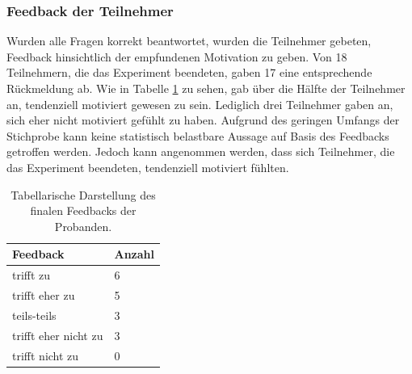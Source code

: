 \subsubsection{Feedback der Teilnehmer}
Wurden alle Fragen korrekt beantwortet, wurden die Teilnehmer gebeten, Feedback hinsichtlich der empfundenen Motivation zu geben. Von 18 Teilnehmern, die das Experiment beendeten, gaben 17 eine entsprechende Rückmeldung ab. Wie in Tabelle \ref{feedback} zu sehen, gab über die Hälfte der Teilnehmer an, tendenziell motiviert gewesen zu sein. Lediglich drei Teilnehmer gaben an, sich eher nicht motiviert gefühlt zu haben. Aufgrund des geringen Umfangs der Stichprobe kann keine statistisch belastbare Aussage auf Basis des Feedbacks getroffen werden. Jedoch kann angenommen werden, dass sich Teilnehmer, die das Experiment beendeten, tendenziell motiviert fühlten.

\begin{table}[htbp]
\caption{Tabellarische Darstellung des finalen Feedbacks der Probanden.}
\begin{tabular}{ p{4cm} |  p{2cm}}
 Feedback & Anzahl \\
 \hline
 trifft zu & 6 \\
 trifft eher zu & 5 \\
 teils-teils & 3 \\
 trifft eher nicht zu & 3 \\
 trifft nicht zu & 0 \\
 \hline
\end{tabular}
\label{feedback}
\end{table}